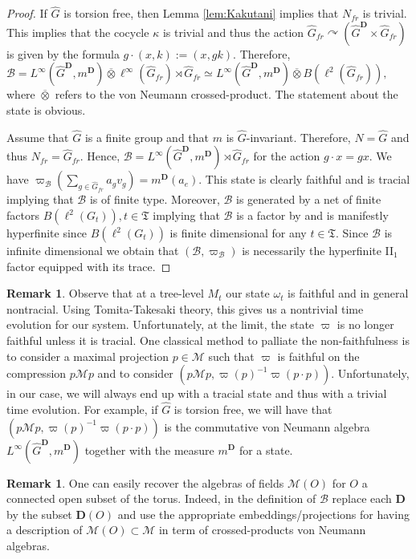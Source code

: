 \documentclass[a4paper,12pt]{amsart}
\numberwithin{equation}{section}
\theoremstyle{definition}
\newtheorem{remark}[theo]{Remark}
\newcommand{\act}{\curvearrowright}
\newcommand{\scrB}{\mathscr B}
\newcommand{\D}{\mathbf D}
\newcommand{\scrM}{\mathscr M}
\newcommand{\ovt}{\overline\otimes}
\newcommand{\fT}{\mathfrak T}
\newcommand{\wh}{\widehat}
\begin{document}
\begin{proof}
If $\wh G$ is torsion free, then Lemma \ref{lem:Kakutani} implies that $N_{fr}$ is trivial.
This implies that the cocycle $\kappa$ is trivial and thus the action $\wh G_{fr}\act ({\wh G}^\D\times \wh G_{fr})$ is given by the formula $g\cdot (x,k):= (x,gk).$
Therefore, $\scrB = L^\infty({\wh G}^\D,m^\D)\ovt  \ell^\infty(\wh G_{fr})\rtimes \wh G_{fr} \simeq L^\infty({\wh G}^\D,m^\D)\ovt B(\ell^2(\wh G_{fr})),$ where $\ovt$ refers to the von Neumann crossed-product.
The statement about the state is obvious.

Assume that $\wh G$ is a finite group and that $m$ is $\wh G$-invariant.
Therefore, $N=\wh G$ and thus $N_{fr}=\wh G_{fr}.$
Hence, $\scrB = L^\infty({\wh G}^\D, m^\D)\rtimes \wh G_{fr}$ for the action $g\cdot x =gx$.
We have $\varpi_\scrB(\sum_{g\in\wh G_{fr}} a_g v_g) = m^\D(a_e).$ 
This state is clearly faithful and is tracial implying that $\scrB$ is of finite type.
Moreover, $\scrB$ is generated by a net of finite factors $B(\ell^2(G_t)), t\in\fT$ implying that $\scrB$ is a factor by \cite[Chapt. XIV, 2, Lem. 2.13]{TakesakiIII} and is manifestly hyperfinite since $B(\ell^2(G_t))$ is finite dimensional for any $t\in\fT.$
Since $\scrB$ is infinite dimensional we obtain that $(\scrB,\varpi_\scrB)$ is necessarily the hyperfinite II$_1$ factor equipped with its trace.
\end{proof}

\begin{remark}
Observe that at a tree-level $M_t$ our state $\omega_t$ is faithful and in general nontracial.
Using Tomita-Takesaki theory, this gives us a nontrivial time evolution for our system.
Unfortunately, at the limit, the state $\varpi$ is no longer faithful unless it is tracial.
One classical method to palliate the non-faithfulness is to consider a maximal projection $p\in\scrM$ such that $\varpi$ is faithful on the compression $p\scrM p$ and to consider  $(p\scrM p, \varpi(p)^{-1}\varpi(p\cdot p))$. 
Unfortunately, in our case, we will always end up with a tracial state and thus with a trivial time evolution.
For example, if $\wh G$ is torsion free, we will have that $(p\scrM p, \varpi(p)^{-1}\varpi(p\cdot p))$ is the commutative von Neumann algebra $L^\infty({\wh G}^\D, m^\D)$ together with the measure $m^\D$ for a state. 
\end{remark}

\begin{remark}
One can easily recover the algebras of fields $\scrM(O)$ for $O$ a connected open subset of the torus.
Indeed, in the definition of $\scrB$ replace each $\D$ by the subset $\D(O)$ and use the appropriate embeddings/projections for having a description of $\scrM(O)\subset \scrM$ in term of crossed-products von Neumann algebras.
\end{remark}
\end{document}
